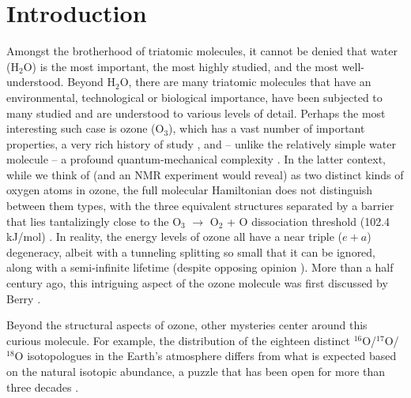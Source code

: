 \documentclass[12pt,a4paper,prb,aps,superscriptaddress]{revtex4}
\begin{document}
\maketitle

\section{Introduction}

Amongst the brotherhood of triatomic molecules, it cannot be denied that water
(H$_2$O) is the most important, the most highly studied, and the most
well-understood.  Beyond H$_2$O, there are many triatomic molecules that have
an environmental, technological or biological importance, have been subjected
to many studied and are understood to various levels of detail.  Perhaps the
most interesting such case is ozone (O$_3$), which has a vast number of
important properties, a very rich history of study \cite{chappuis}, and –
unlike the relatively simple water molecule – a profound quantum-mechanical
complexity \cite{Babikov:anomalousOzone:2003}.  In the latter context, while
we think of (and an NMR experiment would reveal) as two distinct kinds of
oxygen atoms in ozone, the full molecular Hamiltonian does not distinguish
between them types, with the three equivalent structures separated by a
barrier that lies tantalizingly close to the O$_3$ $\rightarrow$ O$_2$ + O
dissociation threshold (102.4 kJ/mol) \cite{Ruscis:ATcT:2022}. In reality, the
energy levels of ozone all have a near triple ($e+a$) degeneracy, albeit with
a tunneling splitting so small that it can be ignored, along with a
semi-infinite lifetime (despite opposing opinion
\cite{Boggs:BerryOzone:2006}).   More than a half century ago, this intriguing
aspect of the ozone molecule was first discussed by Berry
\cite{Berry:Ozone:1960}.

Beyond the structural aspects of ozone, other mysteries center around this
curious molecule.  For example, the distribution of the eighteen distinct
$^{16}$O/$^{17}$O/$^{18}$O isotopologues in the Earth's atmosphere differs
from what is expected based on the natural isotopic abundance, a puzzle that
has been open for more than three decades
\cite{Mauersberger:OzoneMystery:1990}. 
\end{document}
